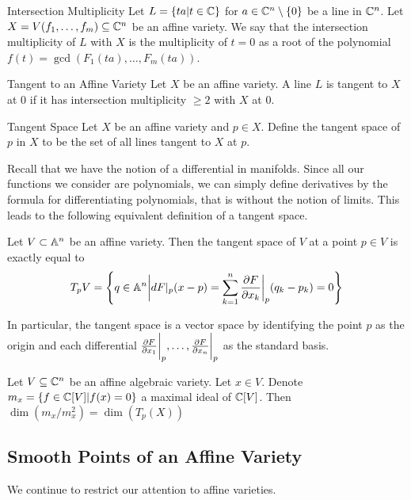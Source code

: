 \documentclass[a4paper]{article}
\begin{document}
\begin{defn}{Intersection Multiplicity}{} Let $L=\{ta|t\in\mathbb{C}\}$ for $a\in\mathbb{C}^n\setminus\{0\}$ be a line in $\mathbb{C}^n$. Let $X=V(f_1,\dots,f_m)\subseteq\mathbb{C}^n$ be an affine variety. We say that the intersection multiplicity of $L$ with $X$ is the multiplicity of $t=0$ as a root of the polynomial $f(t)=\gcd(F_1(ta),\dots,F_m(ta))$. 
\end{defn}

\begin{defn}{Tangent to an Affine Variety}{} Let $X$ be an affine variety. A line $L$ is tangent to $X$ at $0$ if it has intersection multiplicity $\geq 2$ with $X$ at $0$. 
\end{defn}

\begin{defn}{Tangent Space}{} Let $X$ be an affine variety and $p\in X$. Define the tangent space of $p$ in $X$ to be the set of all lines tangent to $X$ at $p$. 
\end{defn}

Recall that we have the notion of a differential in manifolds. Since all our functions we consider are polynomials, we can simply define derivatives by the formula for differentiating polynomials, that is without the notion of limits. This leads to the following equivalent definition of a tangent space. 

\begin{prp}{}{} Let $V\subset\mathbb{A}^n$ be an affine variety. Then the tangent space of $V$ at a point $p\in V$ is exactly equal to $$T_pV=\left\{q\in\mathbb{A}^n\bigg{|}dF|_p(x-p)=\sum_{k=1}^n\frac{\partial F}{\partial x_k}\bigg{|}_p(q_k-p_k)=0\right\}$$
\end{prp}

In particular, the tangent space is a vector space by identifying the point $p$ as the origin and each differential $\frac{\partial F}{\partial x_1}\bigg{|}_p,\dots,\frac{\partial F}{\partial x_n}\bigg{|}_p$ as the standard basis. 

\begin{prp}{}{} Let $V\subseteq\mathbb{C}^n$ be an affine algebraic variety. Let $x\in V$. Denote $m_x=\{f\in\mathbb{C}[V]|f(x)=0\}$ a maximal ideal of $\mathbb{C}[V]$. Then $\dim(m_x/m_x^2)=\dim(T_p(X))$
\end{prp}

\subsection{Smooth Points of an Affine Variety}
We continue to restrict our attention to affine varieties. 
\end{document}
